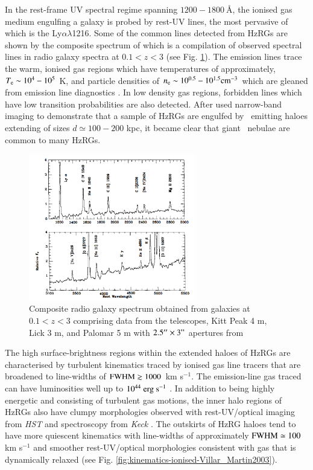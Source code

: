 In the rest-frame UV spectral regime spanning $1200 - 1800~\text{\AA}$, the ionised gas medium engulfing a galaxy is probed by rest-UV lines, the most pervasive of which is the Ly$\alpha\lambda$1216. Some of the common lines detected from HzRGs are shown by the composite spectrum of \citet{McCarthy1993} which is a compilation of observed spectral lines in radio galaxy spectra at $0.1 < z < 3$ (see Fig. \ref{fig:comp_spec_RGs}). The emission lines trace the warm, ionised gas regions which have temperatures of approximately, $T_{\rm{e}} \sim 10^{4}-10^{5}$ K, and particle densities of $n_{\rm{e}} \sim 10^{0.5} - 10^{1.5} \rm cm^{-3}$ which are gleaned from emission line diagnostics \citep{OsterbrockFerland2006}. In low density gas regions, forbidden lines which have low transition probabilities are also detected. 
After \citet{reuland2003} used narrow-band imaging to demonstrate that a sample of HzRGs are engulfed by \lya~emitting haloes extending of sizes $d \simeq 100-200$ kpc, it became clear that giant \lya~nebulae are common to many HzRGs. 

\begin{figure}
\centering
  \includegraphics[width=0.65\textwidth]{plots_chp1/UV_spectrum_McCarthy2003}
  \caption[Composite radio galaxy spectrum from galaxies at $0.1 < z < 3$]{Composite radio galaxy spectrum obtained from galaxies at $0.1 < z < 3$ comprising data from the telescopes, Kitt Peak 4 m, Lick 3 m, and Palomar 5 m with $2.5'' \times 3"$ apertures from \citep{McCarthy1993} }
  \label{fig:comp_spec_RGs}
\end{figure}

The high surface-brightness regions within the extended haloes of HzRGs are characterised by turbulent kinematics traced by ionised gas line tracers that are broadened to line-widths of $\rm FWHM \gtrsim 1000$ km s$^{-1}.$ The emission-line gas traced can have luminosities well up to $\rm 10^{44}~erg~s^{-1}$ \citep{mccarthy1996,villar-martin1999a}. In addition to being highly energetic and consisting of turbulent gas motions, the inner halo regions of HzRGs also have clumpy morphologies observed with rest-UV/optical imaging from {\it HST} and spectroscopy from {\it Keck} \citep{humphrey2006,Villar-Martin2006}. The outskirts of HzRG haloes tend to have more quiescent kinematics with line-widths of approximately $\rm FWHM \simeq 100$ km s$^{-1}$ and smoother rest-UV/optical morphologies consistent with gas that is dynamically relaxed \citep{villar-martin2003} (see Fig. \ref{fig:kinematics-ionised-Villar_Martin2003}). 

